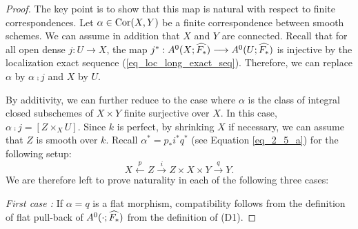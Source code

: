 \begin{proof}
The key point is to show that this map is natural with respect to
finite correspondences. Let $\alpha \in \mathrm{Cor}(X, Y)$ be a finite 
correspondence between smooth schemes. We can assume in addition 
that $X$ and $Y$ are connected. Recall that for all open dense 
$j: U \to X$, the map $j^* : A^0(X; \widehat{F_*}) \longrightarrow 
A^0(U; \widehat{F_*})$ is injective by the localization 
exact sequence (\ref{eq_loc_long_exact_seq}). Therefore, we can 
replace $\alpha$ by $\alpha \comp j$ and $X$ by $U$.

By additivity, we can further reduce to the case where $\alpha$ is
the class of integral closed subschemes of $X \times Y$ finite 
surjective over $X$. In this case, $\alpha \comp j = [Z \times_X 
U].$ Since $k$ is perfect, by shrinking $X$ if necessary, we can
assume that $Z$ is smooth over $k$. Recall $\alpha^* = p_*i^*q^*$ 
(see Equation \ref{eq_2_5_a}) for the following setup:
\[
X \stackrel{p}{\longleftarrow} Z \stackrel{i}{\rightarrow} 
   Z \times X \times Y \stackrel{q}{\rightarrow} Y.
\]
We are therefore left to prove naturality in each of the following
three cases:

\emph{First case : } If $\alpha = q$ is a flat morphism, 
compatibility follows from the definition of flat pull-back of
$A^0(\cdot; \widehat{F_*})$ from the definition of (D1).
\end{proof}
